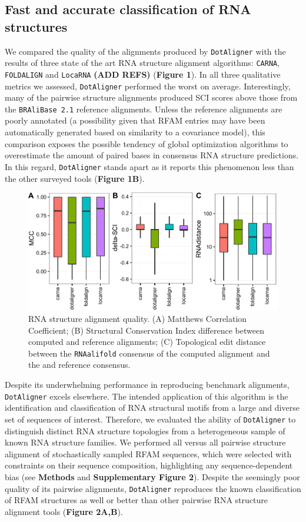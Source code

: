 \documentclass[a4paper,11pt]{article}
\newcommand\dotaligner{\texttt{DotAligner}}
\newcommand\bralibase{\texttt{BRAliBase 2.1}}
\newcommand\locarna{\texttt{LocaRNA}}
\newcommand\foldalign{\texttt{FOLDALIGN}}
\newcommand\carna{\texttt{CARNA}}
\newcommand\rnaalifold{\texttt{RNAalifold}}
\begin{document}
\subsection*{ Fast and accurate classification of RNA structures  } 
We compared the quality of the alignments produced by \dotaligner{} with the results of
three state of the art RNA structure alignment algorithms: \carna{}, \foldalign{} and \locarna{} \textbf{(ADD REFS)}
(\textbf{Figure 1}). In all three qualitative metrics we assessed,  \dotaligner{} performed the 
worst on average. Interestingly, many of the pairwise structure alignments produced 
SCI scores above those from the \bralibase{} reference alignments. Unless the reference
alignments are poorly annotated (a possibility given that RFAM entries may have been automatically 
generated based on similarity to a covariance model), this comparison exposes the possible 
tendency of global optimization algorithms to overestimate the amount of paired bases in 
consensus RNA structure predictions. In this regard, \dotaligner{} stands apart as it reports this 
phenomenon less than the other surveyed tools (\textbf{Figure 1B}). \\


\begin{figure}
 \includegraphics[width=\textwidth]{fig1}
 \caption {RNA structure alignment quality. (A) Matthews Correlation Coefficient; 
 (B) Structural Conservation Index difference between computed and reference alignments; 
 (C) Topological  edit distance between the \rnaalifold{} consensus of the computed alignment 
 and the and reference consensus.  }
\end{figure}

Despite its underwhelming performance in reproducing benchmark alignments, \dotaligner{} 
excels elsewhere. The intended application of this algorithm is the identification and
classification of RNA structural motifs from a large and diverse set of sequences of interest. 
Therefore, we evaluated the ability of \dotaligner{} to distinguish distinct RNA structure
 topologies from a heterogeneous sample of known 
 RNA structure families. We performed all versus all 
pairwise structure alignment of stochastically sampled RFAM sequences, which 
were selected with constraints on their sequence composition,  highlighting any 
sequence-dependent bias (see \textbf{Methods} and \textbf{Supplementary Figure 2}). Despite the seemingly
poor quality of its pairwise alignments, \dotaligner{} reproduces the known classification 
of RFAM structures as well or better than other pairwise RNA structure alignment tools
(\textbf{Figure 2A,B}). \\
\end{document}
